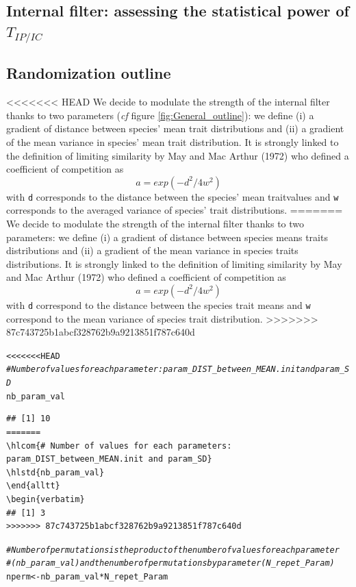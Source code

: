\documentclass[12pt]{article}\usepackage[]{graphicx}\usepackage[]{color}
\makeatletter
\newcommand{\hlcom}[1]{\textcolor[rgb]{0.678,0.584,0.686}{\textit{#1}}}%
\newcommand{\hlopt}[1]{\textcolor[rgb]{0,0,0}{#1}}%
\newcommand{\hlstd}[1]{\textcolor[rgb]{0.345,0.345,0.345}{#1}}%
\newcommand{\hlkwb}[1]{\textcolor[rgb]{0.69,0.353,0.396}{#1}}%
\newenvironment{kframe}{%
 \def\at@end@of@kframe{}%
 \ifinner\ifhmode%
  \def\at@end@of@kframe{\end{minipage}}%
  \begin{minipage}{\columnwidth}%
 \fi\fi%
 \def\FrameCommand##1{\hskip\@totalleftmargin \hskip-\fboxsep
 \colorbox{shadecolor}{##1}\hskip-\fboxsep
     \hskip-\linewidth \hskip-\@totalleftmargin \hskip\columnwidth}%
 \MakeFramed {\advance\hsize-\width
   \@totalleftmargin\z@ \linewidth\hsize
   \@setminipage}}%
 {\par\unskip\endMakeFramed%
 \at@end@of@kframe}
\newenvironment{knitrout}{}{} %
\makeatother
\begin{document}
\begin{landscape}
\cleardoublepage

\section{Internal filter: assessing the statistical power of $T_{IP/IC}$}
  \subsection {Randomization outline}
 
<<<<<<< HEAD
We decide to modulate the strength of the internal filter thanks to two parameters (\textit{cf} figure \ref{fig:General_outline}):
we define (i) a gradient of distance between species' mean trait distributions and (ii) a gradient of the mean variance in species' mean trait distribution. It is strongly linked to the definition of limiting similarity by May and Mac Arthur (1972) who defined a coefficient of competition as $$a = exp (-d^2/4w^2)$$ with \texttt{d} corresponds to the distance between the species' mean traitvalues and \texttt{w} corresponds to the averaged variance of species' trait distributions. 
=======
We decide to modulate the strength of the internal filter thanks to two parameters:
we define (i) a gradient of distance between species means traits distributions and (ii) a gradient of the mean variance in species traits distributions. It is strongly linked to the definition of limiting similarity by May and Mac Arthur (1972) who defined a coefficient of competition as $$a = exp (-d^2/4w^2)$$ with \texttt{d} correspond to the distance between the species trait means and \texttt{w} correspond to the mean variance of species trait distribution. 
>>>>>>> 87c743725b1abcf328762b9a9213851f787c640d

\begin{knitrout}\small
{}\color{fgcolor}\begin{kframe}
\begin{alltt}
<<<<<<< HEAD
\hlcom{# Number of values for each parameter: param_DIST_between_MEAN.init and param_SD}
\hlstd{nb_param_val}
\end{alltt}
\begin{verbatim}
## [1] 10
=======
\hlcom{# Number of values for each parameters: param_DIST_between_MEAN.init and param_SD}
\hlstd{nb_param_val}
\end{alltt}
\begin{verbatim}
## [1] 3
>>>>>>> 87c743725b1abcf328762b9a9213851f787c640d
\end{verbatim}
\begin{alltt}
\hlcom{# Number of permutations is the product of the number of values for each parameter}
\hlcom{#(nb_param_val) and the number of permutations by parameter (N_repet_Param)}
\hlstd{nperm} \hlkwb{<-} \hlstd{nb_param_val} \hlopt{*} \hlstd{N_repet_Param}


\end{alltt}
\end{kframe}
\end{knitrout}
\end{landscape}
\end{document}
